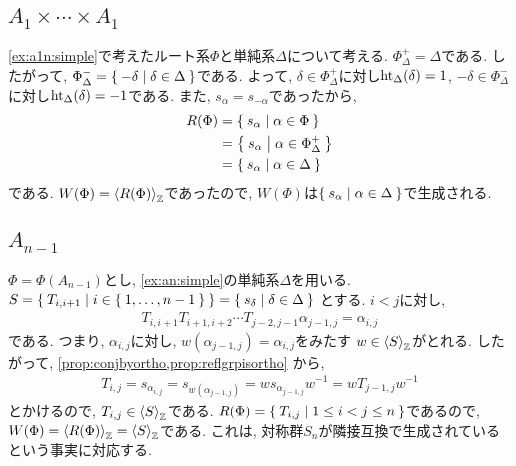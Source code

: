 \subsection{$A_{1}\times\cdots\times A_{1}$}
\cref{ex:a1n:simple}で考えたルート系$\Phi$と単純系$\Delta$について考える.
$\Phi_\Delta^+=\Delta$である.
したがって, $\Phi_\Delta^-=\Set{-\delta|\delta\in\Delta}$である.
よって,
$\delta\in\Phi_\Delta^+$に対し$\operatorname{ht}_\Delta(\delta)=1$,
$-\delta\in\Phi_\Delta^-$に対し$\operatorname{ht}_\Delta(\delta)=-1$である.
また, $s_\alpha=s_{-\alpha}$であったから,
\begin{align*}
  R(\Phi)
  &=\Set{s_\alpha|\alpha\in\Phi}\\
  &=\Set{s_\alpha|\alpha\in\Phi_\Delta^+}\\
  &=\Set{s_\alpha|\alpha\in\Delta}
\end{align*}
である. $W(\Phi)=\Braket{R(\Phi)}_{\mathbb{Z}}$であったので,
$W(\Phi)$は$\Set{s_\alpha|\alpha\in\Delta}$で生成される.




\subsection{$A_{n-1}$}
\label{ex:an:simplesgens}
$\Phi=\Phi(A_{n-1})$とし,
\cref{ex:an:simple}の単純系$\Delta$を用いる.
$S=\Set{T_{i,i+1}|i\in\Set{1,\ldots,n-1}}=\Set{s_\delta|\delta\in\Delta}$
とする.
$i<j$に対し,
\begin{align*}
T_{i,i+1}T_{i+1,i+2}\cdots T_{j-2,j-1} \alpha_{j-1,j}=\alpha_{i,j}
\end{align*}
である. つまり, $\alpha_{i,j}$に対し,
$w(\alpha_{j-1,j})=\alpha_{i,j}$をみたす
$w\in \Braket{S}_{\mathbb{Z}}$がとれる.
したがって,
\cref{prop:conjbyortho,prop:reflgrpisortho}
から,
\begin{align*}
T_{i,j}=s_{\alpha_{i,j}}=s_{w(\alpha_{j-1,j})}=ws_{\alpha_{j-1,j}}w^{-1}=wT_{j-1,j}w^{-1}
\end{align*}
とかけるので, $T_{i,j}\in \Braket{S}_{\mathbb{Z}}$である.
$R(\Phi)=\Set{T_{i,j}|1\leq i<j\leq n}$であるので,
$W(\Phi)=\Braket{R(\Phi)}_{\mathbb{Z}}=\Braket{S}_{\mathbb{Z}}$である.
これは, 対称群$S_n$が隣接互換で生成されているという事実に対応する.

